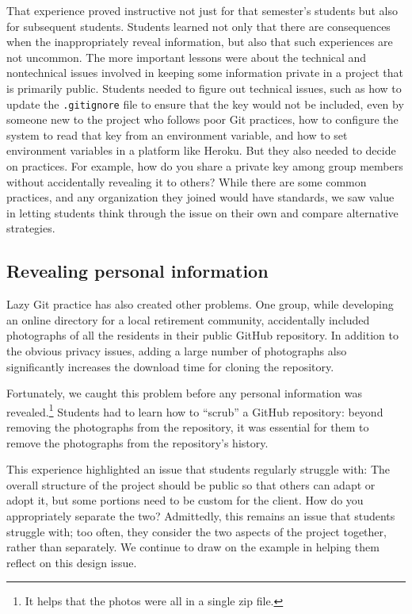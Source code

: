 That experience proved instructive not just for that semester's
students but also for subsequent students.  Students learned not
only that there are consequences when the inappropriately reveal
information, but also that such experiences are not uncommon.  The
more important lessons were about the technical and nontechnical
issues involved in keeping some information private in a project
that is primarily public.  Students needed to figure out technical
issues, such as how to update the \texttt{.gitignore} file to ensure
that the key would not be included, even by someone new to the
project who follows poor Git practices, how to configure the system to read
that key from an environment variable, and how to set environment
variables in a platform like Heroku.  But they also needed to decide
on practices.  For example, how do you share a private key among
group members without accidentally revealing it to others?  While
there are some common practices, and any organization they joined
would have standards, we saw value in letting students think through
the issue on their own and compare alternative strategies.

\subsection{Revealing personal information}

Lazy Git practice has also created other problems.  One group, while
developing an online directory for a local retirement community,
accidentally included photographs of all the residents in their
public GitHub repository.  In addition to the obvious privacy issues,
adding a large number of photographs also significantly increases
the download time for cloning the repository.

Fortunately, we caught this problem before any personal information
was revealed.\footnote{It helps that the photos were all in a single
zip file.}  Students had to learn how to ``scrub'' a GitHub repository:
beyond removing the photographs from the repository, it was essential
for them to remove the photographs from the repository's history.

This experience highlighted an issue that students regularly struggle
with: The overall structure of the project should be public so that
others can adapt or adopt it, but some portions need to be custom
for the client.  How do you appropriately separate the two?
Admittedly, this remains an issue that students struggle with; too
often, they consider the two aspects of the project together, rather
than separately.  We continue to draw on the example in helping them
reflect on this design issue.

